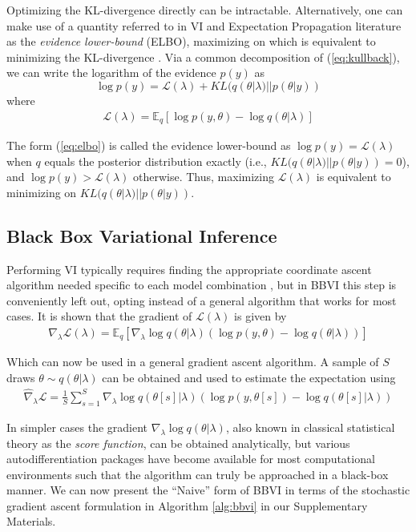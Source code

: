 \documentclass{article}
\begin{document}
Optimizing the KL-divergence directly can be intractable. Alternatively, one can make use of a quantity referred to in VI and Expectation Propagation literature as the \textit{evidence lower-bound} (ELBO), maximizing on which is equivalent to minimizing the KL-divergence \cite{Ranganath-2014}. Via a common decomposition \cite{Goodfellow-2016} of (\ref{eq:kullback}), we can write the logarithm of the evidence $p(y)$ as
$$
\log p(y) = \mathcal{L}(\lambda) + KL(q(\theta | \lambda)||p(\theta|y))
$$
where
\begin{align}
\label{eq:elbo}
\mathcal{L}(\lambda) = \mathbb{E}_{q}[\log p(y,\theta) - \log q(\theta | \lambda) ]
\end{align}

The form (\ref{eq:elbo}) is called the evidence lower-bound as $\log p(y) = \mathcal{L}(\lambda)$ when $q$ equals the posterior distribution exactly (i.e., $KL(q(\theta | \lambda)||p(\theta|y)) = 0$), and $\log p(y) > \mathcal{L}(\lambda)$ otherwise. Thus, maximizing $\mathcal{L}(\lambda)$ is equivalent to minimizing on $KL(q(\theta | \lambda)||p(\theta|y))$.

\subsection{Black Box Variational Inference}

Performing VI typically requires finding the appropriate coordinate ascent algorithm needed specific to each model combination \cite{Blei-2017}, but in BBVI this step is conveniently left out, opting instead of a general algorithm that works for most cases. It is shown \cite{Ranganath-2014} that the gradient of $\mathcal{L}(\lambda)$ is given by
\begin{align}
\label{eq:elbograd}
\nabla_\lambda \mathcal{L}(\lambda) = \mathbb{E}_{q}[\nabla_{\lambda} \log q(\theta | \lambda) (\log p(y, \theta) - \log q(\theta | \lambda))]
\end{align}

Which can now be used in a general gradient ascent algorithm. A sample of $S$ draws $\theta \sim q(\theta | \lambda)$ can be obtained and used to estimate the expectation using
\begin{align}
\label{eq:naivebbvi}
    \hat\nabla_\lambda \mathcal{L} = \frac{1}{S} \sum^{S}_{s=1} \nabla_{\lambda} \log q(\theta[s] | \lambda) (\log p(y, \theta[s]) - \log q(\theta[s] | \lambda))
\end{align}

In simpler cases the gradient $\nabla_{\lambda} \log q(\theta | \lambda)$, also known in classical statistical theory as the \textit{score function}, can be obtained analytically, but various autodifferentiation packages have become available for most computational environments such that the algorithm can truly be approached in a black-box manner. We can now present the ``Naive'' form of BBVI in terms of the stochastic gradient ascent formulation in Algorithm \ref{alg:bbvi} in our Supplementary Materials.
\end{document}
